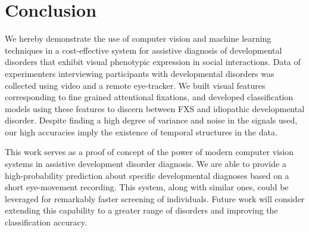 \documentclass{llncs}
\begin{document}
\vspace*{-\baselineskip}
\section{Conclusion}
\vspace*{-\baselineskip}

{\color{red}We hereby demonstrate the use of computer vision and machine learning techniques in a cost-effective system for assistive diagnosis of developmental disorders that exhibit visual phenotypic expression in social interactions. Data of experimenters interviewing participants with developmental disorders was collected using video and a remote eye-tracker. We built visual features corresponding to fine grained attentional fixations, and developed classification models using these features to discern between FXS and idiopathic developmental disorder. Despite finding a high degree of variance and noise in the signals used, our high accuracies imply the existence of temporal structures in the data.}

This work serves as a proof of concept of the power of modern computer vision systems in assistive development disorder diagnosis. We are able to provide a high-probability prediction about specific developmental diagnoses based on a short eye-movement recording. This system, along with similar ones, could be leveraged for remarkably faster screening of individuals. Future work will consider extending this capability to a greater range of disorders and improving the classification accuracy.
  \vspace*{-\baselineskip}
  
  
\end{document}
